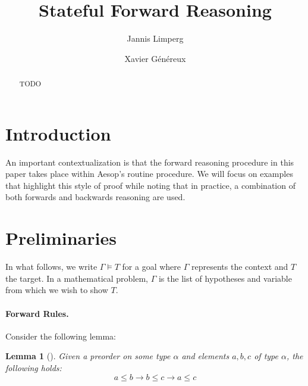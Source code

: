 \documentclass[runningheads]{llncs}
\newtheorem{lem}{Lemma}
\newcommand{\xcom}[1]{{\color{cyan}{Xavier: #1}} }
\begin{document}
\title{Stateful Forward Reasoning}


\author{Jannis Limperg \and
  Xavier Généreux}


\maketitle

\begin{abstract}
  TODO

\end{abstract}

\section{Introduction}
\xcom{TODO}

\xcom{ Specify the problem (user defined rules)
 + deal with changes with local context}
\xcom{ Talk about aesop}
\xcom{ Do we outline the solution?}

An important contextualization is that the forward reasoning procedure in this paper takes place within Aesop's routine procedure.
We will focus on examples that highlight this style of proof while noting that in practice, a combination of both forwards and backwards reasoning are used.

\section{Preliminaries}

\xcom{Adapt for CADE.}

In what follows, we write $\Gamma \models T$ for a goal where $\Gamma$ represents the context and $T$ the target.
In a mathematical problem, $\Gamma$ is the list of hypotheses and variable from which we wish to show $T$.

\paragraph{Forward Rules.}
Consider the following lemma:
\begin{lem}[]
  Given a preorder on some type $\alpha$ and elements $a,b,c$ of type $\alpha$, the following holds:
  $$a \leq b \rightarrow b \leq c \rightarrow a \leq c$$
\end{lem}
\end{document}
